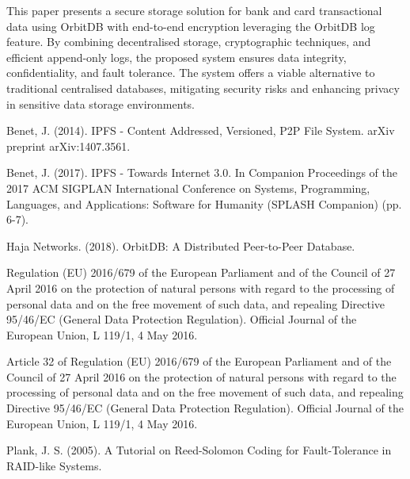 \documentclass[a4paper,11 pt]{article}
\theoremstyle{definition}
\begin{document}
This paper presents a secure storage solution for bank and card transactional data using OrbitDB with end-to-end encryption leveraging the OrbitDB log feature. By combining decentralised storage, cryptographic techniques, and efficient append-only logs, the proposed system ensures data integrity, confidentiality, and fault tolerance. The system offers a viable alternative to traditional centralised databases, mitigating security risks and enhancing privacy in sensitive data storage environments.

\begin{thebibliography}{9}
Benet, J. (2014). IPFS - Content Addressed, Versioned, P2P File System. arXiv preprint arXiv:1407.3561.

Benet, J. (2017). IPFS - Towards Internet 3.0. In Companion Proceedings of the 2017 ACM SIGPLAN International Conference on Systems, Programming, Languages, and Applications: Software for Humanity (SPLASH Companion) (pp. 6-7).

Haja Networks. (2018). OrbitDB: A Distributed Peer-to-Peer Database.

Regulation (EU) 2016/679 of the European Parliament and of the Council of 27 April 2016 on the protection of natural persons with regard to the processing of personal data and on the free movement of such data, and repealing Directive 95/46/EC (General Data Protection Regulation). Official Journal of the European Union, L 119/1, 4 May 2016.

Article 32 of Regulation (EU) 2016/679 of the European Parliament and of the Council of 27 April 2016 on the protection of natural persons with regard to the processing of personal data and on the free movement of such data, and repealing Directive 95/46/EC (General Data Protection Regulation). Official Journal of the European Union, L 119/1, 4 May 2016.

Plank, J. S. (2005). A Tutorial on Reed-Solomon Coding for Fault-Tolerance in RAID-like Systems.

\end{thebibliography}
\end{document}
